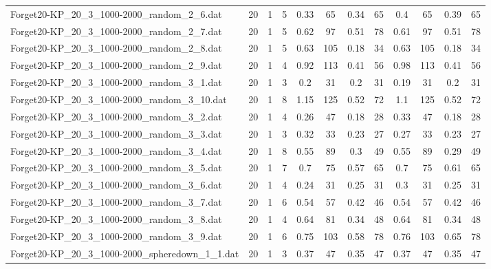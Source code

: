 \begin{sidewaystable}[!ht]
{\begin{tabular}{lccccccccccc}
Forget20-KP\_20\_3\_1000-2000\_random\_2\_6.dat & 20 & 1 & 5 &  \textcolor{blue2}{0.33} & 65 & 0.34 & 65 & 0.4 & 65 & 0.39 & 65 \\
Forget20-KP\_20\_3\_1000-2000\_random\_2\_7.dat & 20 & 1 & 5 & 0.62 & 97 &  \textcolor{blue2}{0.51} & 78 & 0.61 & 97 &  \textcolor{blue2}{0.51} & 78 \\
Forget20-KP\_20\_3\_1000-2000\_random\_2\_8.dat & 20 & 1 & 5 & 0.63 & 105 &  \textcolor{blue2}{0.18} & 34 & 0.63 & 105 &  \textcolor{blue2}{0.18} & 34 \\
Forget20-KP\_20\_3\_1000-2000\_random\_2\_9.dat & 20 & 1 & 4 & 0.92 & 113 &  \textcolor{blue2}{0.41} & 56 & 0.98 & 113 &  \textcolor{blue2}{0.41} & 56 \\
Forget20-KP\_20\_3\_1000-2000\_random\_3\_1.dat & 20 & 1 & 3 & 0.2 & 31 & 0.2 & 31 &  \textcolor{blue2}{0.19} & 31 & 0.2 & 31 \\
Forget20-KP\_20\_3\_1000-2000\_random\_3\_10.dat & 20 & 1 & 8 & 1.15 & 125 &  \textcolor{blue2}{0.52} & 72 & 1.1 & 125 &  \textcolor{blue2}{0.52} & 72 \\
Forget20-KP\_20\_3\_1000-2000\_random\_3\_2.dat & 20 & 1 & 4 & 0.26 & 47 &  \textcolor{blue2}{0.18} & 28 & 0.33 & 47 &  \textcolor{blue2}{0.18} & 28 \\
Forget20-KP\_20\_3\_1000-2000\_random\_3\_3.dat & 20 & 1 & 3 & 0.32 & 33 &  \textcolor{blue2}{0.23} & 27 & 0.27 & 33 &  \textcolor{blue2}{0.23} & 27 \\
Forget20-KP\_20\_3\_1000-2000\_random\_3\_4.dat & 20 & 1 & 8 & 0.55 & 89 & 0.3 & 49 & 0.55 & 89 &  \textcolor{blue2}{0.29} & 49 \\
Forget20-KP\_20\_3\_1000-2000\_random\_3\_5.dat & 20 & 1 & 7 & 0.7 & 75 & 0.57 & 65 & 0.7 & 75 & 0.61 & 65 \\
Forget20-KP\_20\_3\_1000-2000\_random\_3\_6.dat & 20 & 1 & 4 &  \textcolor{blue2}{0.24} & 31 & 0.25 & 31 & 0.3 & 31 & 0.25 & 31 \\
Forget20-KP\_20\_3\_1000-2000\_random\_3\_7.dat & 20 & 1 & 6 & 0.54 & 57 &  \textcolor{blue2}{0.42} & 46 & 0.54 & 57 &  \textcolor{blue2}{0.42} & 46 \\
Forget20-KP\_20\_3\_1000-2000\_random\_3\_8.dat & 20 & 1 & 4 & 0.64 & 81 &  \textcolor{blue2}{0.34} & 48 & 0.64 & 81 &  \textcolor{blue2}{0.34} & 48 \\
Forget20-KP\_20\_3\_1000-2000\_random\_3\_9.dat & 20 & 1 & 6 & 0.75 & 103 &  \textcolor{blue2}{0.58} & 78 & 0.76 & 103 & 0.65 & 78 \\
Forget20-KP\_20\_3\_1000-2000\_spheredown\_1\_1.dat & 20 & 1 & 3 & 0.37 & 47 &  \textcolor{blue2}{0.35} & 47 & 0.37 & 47 &  \textcolor{blue2}{0.35} & 47 \\

\end{tabular}}
\end{sidewaystable}
